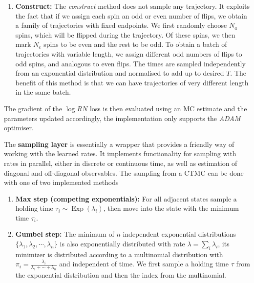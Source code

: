 \begin{enumerate}[label=\roman*)]
\begin{figure}[t!]
		\label{fig:qsampl}
	\end{figure}
	
	\item \textbf{Construct:} The \emph{construct} method does not sample any trajectory. It exploits the fact that if we assign each spin an odd or even number of flips, we obtain a family of trajectories with fixed endpoints. We first randomly choose $N_a$ spins, which will be flipped during the trajectory. Of these spins, we then mark $N_e$ spins to be even and the rest to be odd. To obtain a batch of trajectories with variable length, we assign different odd numbers of flips to odd spins, and analogous to even flips. The times are sampled independently from an exponential distribution and normalised to add up to desired $T$. The benefit of this method is that we can have trajectories of very different length in the same batch.
\end{enumerate}
The gradient of the $\log RN$ loss is then evaluated using an MC estimate and the parameters updated accordingly, the implementation only supports the \emph{ADAM} optimiser. 

The \textbf{sampling layer} is essentially a wrapper that provides a friendly way of working with the learned rates. It implements functionality for sampling with rates in parallel, either in discrete or continuous time, as well as estimation of diagonal and off-diagonal observables. The sampling from a CTMC can be done with one of two implemented methods
\begin{enumerate}[label=\roman*)]
	\item \textbf{Max step (competing exponentials):} For all adjacent states sample a holding time $\tau_i \sim \operatorname{Exp}(\lambda_i)$, then move into the state with the minimum time $\tau_i$.
	\item \textbf{Gumbel step:} The minimum of $n$ independent exponential distributions $\{\lambda_1, \lambda_2, \cdots, \lambda_n\}$ is also exponentially distributed with rate $\lambda = \sum_i \lambda_i$, its minimizer is distributed according to a multinomial distribution with $\pi_i =\frac{\lambda_{i}}{\lambda_{1}+\cdots+\lambda_{n}} $ and independent of time. We first sample a holding time $\tau$ from the exponential distribution and then the index from the multinomial.
\end{enumerate}
